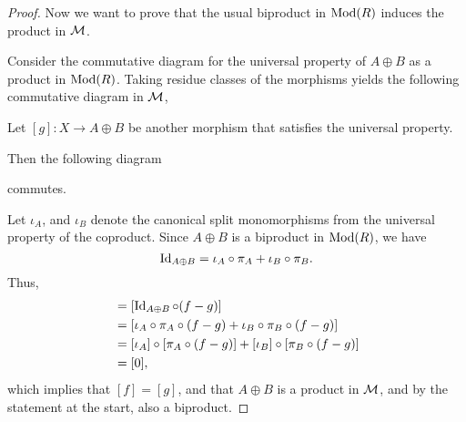 \begin{proof}
    Now we want to prove that the usual biproduct in \( \operatorname{Mod}(R) \) induces the product in \( {\mathcal{M}} \).
    
    Consider the commutative diagram for the universal property of \( A \oplus B \) as a product in \( \operatorname{Mod}(R) \). Taking residue classes of the morphisms yields the following commutative diagram in \( {\mathcal{M}} \),
    \begin{center}
    \end{center}
    Let \( [g]: X \to A \oplus B \) be another morphism that satisfies the universal property.

    Then the following diagram
    \begin{center}
    \end{center}
    commutes.

    Let \( \iota_A \), and \( \iota_B \) denote the canonical split monomorphisms from the universal property of the coproduct. Since \( A \oplus B \) is a biproduct in \( \operatorname{Mod}(R) \), we have
    \[
        \operatorname{Id}_{A \oplus B} = \iota_A \circ \pi_A + \iota_B \circ \pi_B.
    \]
    Thus,
    \begin{align*}
        [f - g] &= [\Id_{A \oplus B} \circ (f - g)] \\
        &= [\iota_A \circ \pi_A \circ (f - g) + \iota_B \circ \pi_B \circ (f - g)] \\
        &= [\iota_A] \circ [\pi_A \circ (f - g)] + [\iota_B] \circ [\pi_B \circ (f - g)] \\
        &= [0],
    \end{align*}
    which implies that \( [f] = [g] \), and that \( A \oplus B \) is a product in \( {\mathcal{M}} \), and by the statement at the start, also a biproduct.
\end{proof}


